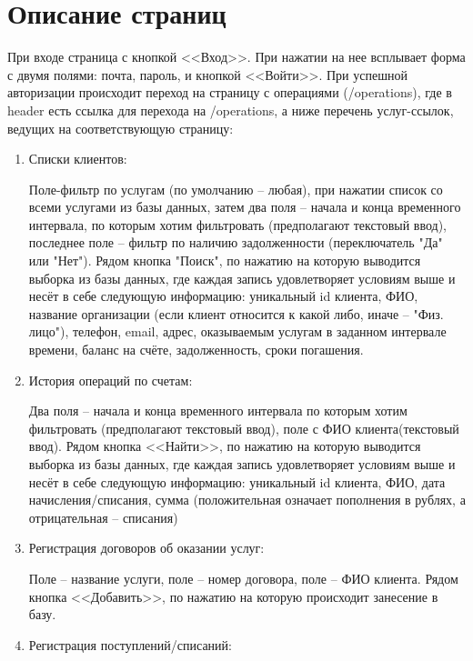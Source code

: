 \documentclass[oneside,senior,etd]{BYUPhysForDegree}
\begin{document}
\fixmargins
\makepreliminarypages
\oneandhalfspace

\newpage 
 
\newpage
\section{Описание страниц}

При входе страница с кнопкой <<Вход>>. При нажатии на нее всплывает форма с двумя полями: почта, пароль, и кнопкой <<Войти>>. При успешной авторизации происходит переход на страницу с операциями (/operations), где в header есть ссылка для перехода на /operations, а ниже перечень услуг-ссылок, ведущих на соответствующую страницу:
\begin{enumerate}
    \item Списки клиентов:
    
    Поле-фильтр по услугам (по умолчанию -- любая), при нажатии список со всеми услугами из базы данных, затем два поля -- начала и конца временного интервала, по которым хотим фильтровать (предполагают текстовый ввод), последнее поле -- фильтр по наличию задолженности (переключатель "Да" или "Нет"). Рядом кнопка "Поиск", по нажатию на которую выводится выборка из базы данных, где каждая запись удовлетворяет условиям выше и несёт в себе следующую информацию: уникальный id клиента, ФИО, название организации (если клиент относится к какой либо, иначе -- "Физ. лицо"), телефон, email, адрес, оказываемым услугам в заданном интервале времени, баланс на счёте, задолженность, сроки погашения.
    
    \item История операций по счетам:
    
    Два поля -- начала и конца временного интервала по которым хотим фильтровать (предполагают текстовый ввод), поле с ФИО клиента(текстовый ввод). Рядом кнопка <<Найти>>, по нажатию на которую выводится выборка из базы данных, где каждая запись удовлетворяет условиям выше и несёт в себе следующую информацию: 
    уникальный id клиента, ФИО, дата начисления/списания, сумма (положительная означает пополнения в рублях, а отрицательная -- списания)
    \item Регистрация договоров об оказании услуг:
    
    Поле -- название услуги, поле -- номер договора, поле -- ФИО клиента. Рядом кнопка <<Добавить>>, по нажатию на которую происходит занесение в базу.
    \item Регистрация поступлений/списаний:
    

\end{enumerate}
\end{document}
